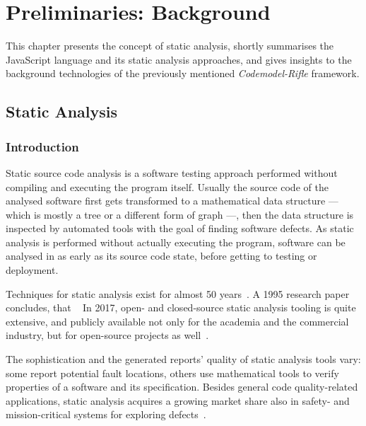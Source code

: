 \chapter{Preliminaries: Background}
\label{chapter:background}

This chapter presents the concept of static analysis, shortly summarises the JavaScript language and its static analysis approaches, and gives insights to the background technologies of the previously mentioned \emph{Codemodel-Rifle} framework.


\section{Static Analysis}


\subsection{Introduction}

Static source code analysis is a software testing approach performed without compiling and executing the program itself. Usually the source code of the analysed software first gets transformed to a mathematical data structure — which is mostly a tree or a different form of graph —, then the data structure is inspected by automated tools with the goal of finding software defects. As static analysis is performed without actually executing the program, software can be analysed in as early as its source code state, before getting to testing or deployment.

Techniques for static analysis exist for almost 50 years~\cite{emanuelsson2008comparative}. A 1995 research paper concludes, that ~\cite{373902} In 2017, open- and closed-source static analysis tooling is quite extensive, and publicly available not only for the academia and the commercial industry, but for open-source projects as well~\cite{wikipedia-static-analysis}.

The sophistication and the generated reports' quality of static analysis tools vary: some report potential fault locations, others use mathematical tools to verify properties of a software and its specification. Besides general code quality-related applications, static analysis acquires a growing market share also in safety- and mission-critical systems for exploring defects~\cite{livshits2006improving}.



